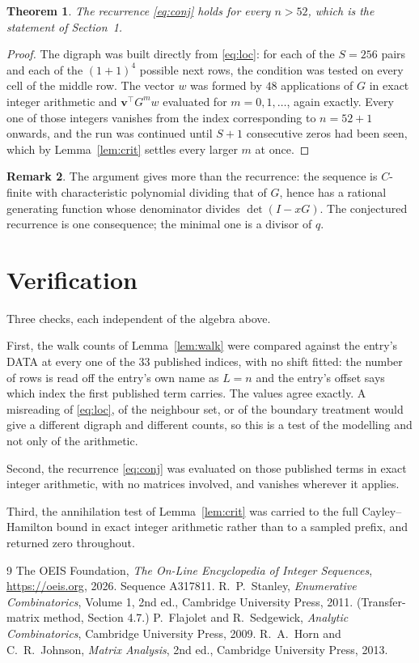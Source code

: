 \documentclass[11pt,a4paper]{article}
\theoremstyle{plain}
\newtheorem{theorem}{Theorem}
\theoremstyle{definition}
\newtheorem{remark}[theorem]{Remark}
\begin{document}
\begin{theorem}
The recurrence \eqref{eq:conj} holds for every $n>52$, which is the statement of
Section~1.
\end{theorem}

\begin{proof}
The digraph was built directly from \eqref{eq:loc}: for each of the $S=256$ pairs and each
of the $(1+1)^{4}$ possible next rows, the condition was tested on every cell of
the middle row. The vector $w$ was formed by $48$ applications of $G$ in exact integer
arithmetic and $\mathbf{v}^{\!\top}G^{m}w$ evaluated for $m=0,1,\dots$, again exactly.
Every one of those integers vanishes from the index corresponding to $n=52+1$ onwards,
and the run was continued until $S+1$ consecutive zeros had been seen, which by
Lemma~\ref{lem:crit} settles every larger $m$ at once.
\end{proof}

\begin{remark}
The argument gives more than the recurrence: the sequence is $C$-finite with characteristic
polynomial dividing that of $G$, hence has a rational generating function whose denominator
divides $\det(I-xG)$. The conjectured recurrence is one consequence; the minimal one is a
divisor of $q$.
\end{remark}

\section{Verification}

Three checks, each independent of the algebra above.

First, the walk counts of Lemma~\ref{lem:walk} were compared against the entry's DATA at
every one of the $33$ published indices, with no shift fitted: the number of rows is
read off the entry's own name as $L=n$ and the entry's offset says which index the first
published term carries. The values agree exactly. A misreading of \eqref{eq:loc}, of the
neighbour set, or of the boundary treatment would give a different digraph and different
counts, so this is a test of the modelling and not only of the arithmetic.

Second, the recurrence \eqref{eq:conj} was evaluated on those published terms in exact
integer arithmetic, with no matrices involved, and vanishes wherever it applies.

Third, the annihilation test of Lemma~\ref{lem:crit} was carried to the full
Cayley--Hamilton bound in exact integer arithmetic rather than to a sampled prefix, and
returned zero throughout.

\begin{thebibliography}{9}
 The OEIS Foundation, \emph{The On-Line Encyclopedia of Integer
Sequences}, \url{https://oeis.org}, 2026. Sequence A317811.
 R.~P.~Stanley, \emph{Enumerative Combinatorics}, Volume 1, 2nd ed.,
Cambridge University Press, 2011. (Transfer-matrix method, Section 4.7.)
 P.~Flajolet and R.~Sedgewick, \emph{Analytic Combinatorics}, Cambridge
University Press, 2009.
 R.~A.~Horn and C.~R.~Johnson, \emph{Matrix Analysis}, 2nd ed., Cambridge
University Press, 2013.
\end{thebibliography}
\end{document}

